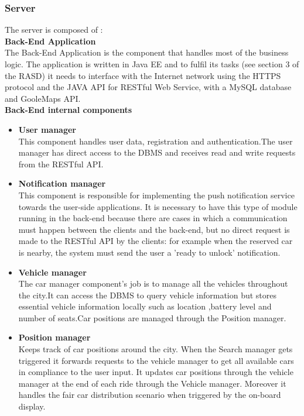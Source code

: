 \subsubsection{Server}
The server is composed of :\\[0.4in]
\textbf{Back-End Application}\\[0.1in]
The Back-End Application is the  component that handles most of the business logic.
The application is written in Java EE and to fulfil its tasks (see section
3 of the RASD) it needs to interface with the Internet network using
the HTTPS protocol and the JAVA API for RESTful Web Service, with a
MySQL database and GooleMaps API.\\[0.4in]
\textbf{Back-End internal components}\\[0.1in]
\begin{itemize}

\item \textbf{User manager}\\
This component handles user data, registration and authentication.The user manager has direct access to the DBMS and receives read and write requests from the RESTful API.

\item \textbf{Notification manager}\\
This component is responsible for implementing the push notification service towards
the user-side applications.
It is necessary to have this type of module running in the back-end because
there are cases in which a communication must happen between the clients and
the back-end, but no direct request is made to the RESTful API by the clients:
for example when the reserved car is nearby, the system must send the user a 'ready to unlock' notification.

\item \textbf{Vehicle manager}\\
The car manager component's job is to manage all the vehicles throughout the city.It can access the DBMS to query vehicle information but stores essential vehicle information locally such as location ,battery level and number of seats.Car positions
are managed through the Position manager.

\item \textbf{Position manager}\\
Keeps track of car positions around the city. When the Search manager gets triggered it forwards requests to the vehicle manager to get all available cars in compliance to the user input. It updates car positions through the vehicle manager at the end of each ride through the Vehicle manager. Moreover it handles the fair car distribution scenario when triggered by the on-board display. 


\end{itemize}
